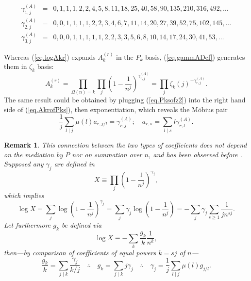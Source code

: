 \documentclass{amsart}
\newtheorem{rem}{Remark}
\begin{document}
\begin{eqnarray}
\gamma_{1,j}^{(A)} &=& 0, 1, 1, 1, 2, 2, 4, 5, 8, 11, 18, 25, 40, 58, 90, 135, 210, 316, 492,\ldots
\\
\gamma_{2,j}^{(A)} &=& 0, 0, 1, 1, 1, 1, 2, 2, 3, 4, 6, 7, 11, 14, 20, 27, 39, 52, 75, 102, 145,\ldots
\\
\gamma_{3,j}^{(A)} &=& 0, 0, 0, 1, 1, 1, 1, 1, 2, 2, 3, 3, 5, 6, 8, 10, 14, 17, 24, 30, 41, 53,\ldots
\end{eqnarray}

Whereas (\ref{eq.logAkr}) expands $A_k^{(r)}$ in the $P_k$ basis,
(\ref{eq.gammADef}) generates them in $\zeta_k$ basis:
\begin{equation}
A_k^{(r)}
=
\prod_{\Omega(n)=k} \prod_j \left(1-\frac{1}{n^j}\right)^{\gamma_{r,j}^{(A)}}
=
\prod_j \zeta_k(j)^{-\gamma_{r,j}^{(A)}}
.
\end{equation}
The same result could be obtained by plugging (\ref{eq.Pksofz2}) into
the right hand side of (\ref{eq.AkrofPks}), then exponentiation,
which reveals the M\"obius pair
\begin{equation}
\frac{1}{j}\sum_{l\mid j}\mu(l) a_{r,j/l} = \gamma_{r,j}^{(A)};\quad
a_{r,s} = \sum_{l\mid s}l \gamma_{r,l}^{(A)}.
\label{eq.mobA}
\end{equation}
\begin{rem}
This connection between the two types of coefficients
does not depend on the mediation by $P$ nor on summation over $n$,
and has been observed before \cite{HuaJCTA79,LiJCTA115,deReyniaAcAr119}.
Supposed any $\gamma_j$ are defined in
\begin{equation}
X\equiv \prod_j\left(1-\frac{1}{n^j}\right)^{\gamma_j},
\end{equation}
which implies
\begin{equation}
\log X=\sum_j \log\left(1-\frac{1}{n^j}\right)^{\gamma_j}
= \sum_j \gamma_j\log\left(1-\frac{1}{n^j}\right)
= -\sum_j \gamma_j \sum_{s\ge 1} \frac{1}{jn^{sj}}.
\end{equation}
Let furthermore $g_k$ be defined via
\begin{equation}
\log X\equiv -\sum_k \frac{g_k}{k}\frac{1}{n^k},
\end{equation}
then---by comparison of coefficients of equal powers $k=sj$ of $n$---
\begin{equation}
\frac{g_k}{k}=\sum_{j\mid k} \frac{\gamma_j}{k/j}
\quad
\therefore
\quad
g_k=\sum_{j\mid k} j\gamma_j
\quad
\therefore
\quad
\gamma_j = \frac{1}{j}\sum_{l\mid j}\mu(l)g_{j/l}.
\label{eq.mob}
\end{equation}
\end{rem}
\end{document}
